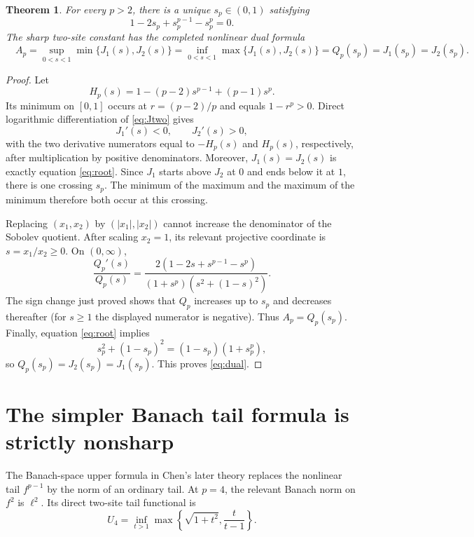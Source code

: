 \documentclass[11pt]{article}
\newtheorem{theorem}{Theorem}
\begin{document}
\begin{theorem}\label{thm:main}
For every $p>2$, there is a unique $s_p\in(0,1)$ satisfying
\begin{equation}\label{eq:root}
 1-2s_p+s_p^{p-1}-s_p^p=0.
\end{equation}
The sharp two-site constant has the completed nonlinear dual formula
\begin{equation}\label{eq:dual}
 \boxed{\quad
 A_p=\sup_{0<s<1}\min\{J_1(s),J_2(s)\}
 =\inf_{0<s<1}\max\{J_1(s),J_2(s)\}
 =Q_p(s_p)=J_1(s_p)=J_2(s_p).
 \quad}
\end{equation}
\end{theorem}

\begin{proof}
Let
\[
 H_p(s)=1-(p-2)s^{p-1}+(p-1)s^p.
\]
Its minimum on $[0,1]$ occurs at $r=(p-2)/p$ and equals
$1-r^p>0$.  Direct logarithmic differentiation of \eqref{eq:Jtwo} gives
\[
 J_1'(s)<0,\qquad J_2'(s)>0,
\]
with the two derivative numerators equal to $-H_p(s)$ and $H_p(s)$,
respectively, after multiplication by positive denominators.  Moreover,
$J_1(s)=J_2(s)$ is exactly equation \eqref{eq:root}.  Since $J_1$ starts
above $J_2$ at $0$ and ends below it at $1$, there is one crossing $s_p$.
The minimum of the maximum and the maximum of the minimum therefore both
occur at this crossing.

Replacing $(x_1,x_2)$ by $(|x_1|,|x_2|)$ cannot increase the denominator of
the Sobolev quotient.  After scaling $x_2=1$, its relevant projective
coordinate is $s=x_1/x_2\ge0$.  On $(0,\infty)$,
\[
 \frac{Q_p'(s)}{Q_p(s)}=
 \frac{2(1-2s+s^{p-1}-s^p)}{(1+s^p)(s^2+(1-s)^2)}.
\]
The sign change just proved shows that $Q_p$ increases up to $s_p$ and
decreases thereafter (for $s\ge1$ the displayed numerator is negative).
Thus $A_p=Q_p(s_p)$.  Finally, equation \eqref{eq:root} implies
\[
 s_p^2+(1-s_p)^2=(1-s_p)(1+s_p^p),
\]
so $Q_p(s_p)=J_2(s_p)=J_1(s_p)$.  This proves \eqref{eq:dual}.
\end{proof}

\section{The simpler Banach tail formula is strictly nonsharp}
The Banach-space upper formula in Chen's later theory replaces the nonlinear
tail $f^{p-1}$ by the norm of an ordinary tail.  At $p=4$, the relevant
Banach norm on $f^2$ is $\ell^2$.  Its direct two-site tail functional is
\begin{equation}\label{eq:U}
 U_4=\inf_{t>1}\max\left\{\sqrt{1+t^2},\frac{t}{t-1}\right\}.
\end{equation}
\end{document}
